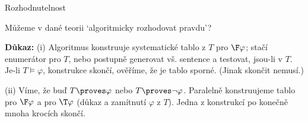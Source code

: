 \documentclass{beamer}
\begin{document}
\begin{frame}{Rozhodnutelnost}

    \vspace{-3pt}
    Můžeme v dané teorii \alert{`algoritmicky rozhodovat pravdu'}?

    \vspace{-3pt}

    
    
    
    \textbf{Důkaz:} \alert{(i)} Algoritmus konstruuje systematické tablo z $T$ pro $\F\varphi$; stačí enumerátor pro $T$, nebo postupně generovat vš. sentence a testovat, jsou-li v $T$. Je-li $T\models\varphi$, konstrukce skončí, ověříme, že je tablo sporné. (Jinak skončit nemusí.)
    
    \vspace{-3pt}  
    \alert{(ii)}
    Víme, že buď $T\proves\varphi$ nebo $T\proves\neg\varphi$. Paralelně konstruujeme tablo pro $\F\varphi$ a pro $\T\varphi$ (důkaz a zamítnutí $\varphi$ z $T$). Jedna z konstrukcí po konečně mnoha krocích skončí.
    \hfill\qedsymbol


\end{frame}
\end{document}
